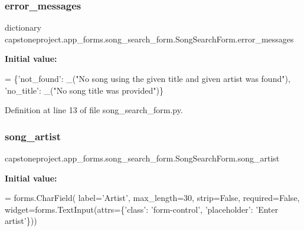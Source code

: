 \subsubsection{\texorpdfstring{error\+\_\+messages}{error\_messages}}
{\footnotesize\ttfamily dictionary capstoneproject.\+app\+\_\+forms.\+song\+\_\+search\+\_\+form.\+Song\+Search\+Form.\+error\+\_\+messages\hspace{0.3cm}{\ttfamily [static]}}

{\bfseries Initial value\+:}
\begin{DoxyCode}
=  \{\textcolor{stringliteral}{'not\_found'}: \_(\textcolor{stringliteral}{"No song using the given title and given artist was found"}),
                      \textcolor{stringliteral}{'no\_title'}: \_(\textcolor{stringliteral}{"No song title was provided"})\}
\end{DoxyCode}


Definition at line 13 of file song\+\_\+search\+\_\+form.\+py.

\mbox{\label{classcapstoneproject_1_1app__forms_1_1song__search__form_1_1_song_search_form_aab8645923825e1e16ac54d73d9d3455b}} 
\subsubsection{\texorpdfstring{song\+\_\+artist}{song\_artist}}
{\footnotesize\ttfamily capstoneproject.\+app\+\_\+forms.\+song\+\_\+search\+\_\+form.\+Song\+Search\+Form.\+song\+\_\+artist\hspace{0.3cm}{\ttfamily [static]}}

{\bfseries Initial value\+:}
\begin{DoxyCode}
=  forms.CharField(
        label=\textcolor{stringliteral}{'Artist'},
        max\_length=30,
        strip=\textcolor{keyword}{False},
        required=\textcolor{keyword}{False},
        widget=forms.TextInput(attrs=\{\textcolor{stringliteral}{'class'}: \textcolor{stringliteral}{'form-control'}, \textcolor{stringliteral}{'placeholder'}: \textcolor{stringliteral}{'Enter artist'}\}))
\end{DoxyCode}


